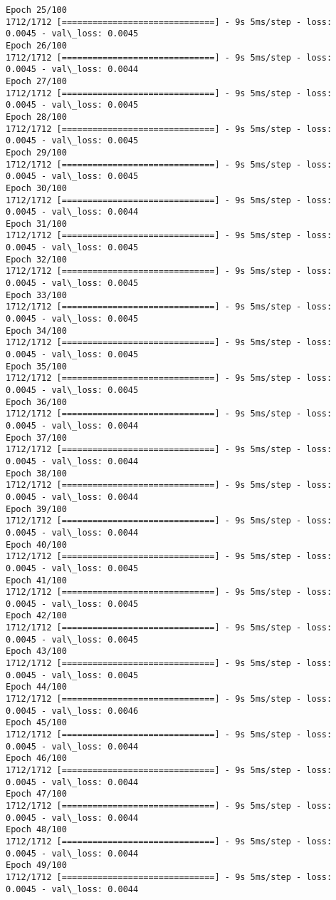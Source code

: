\documentclass[11pt]{article}
\begin{document}
\begin{Verbatim}[commandchars=\\\{\}]
Epoch 25/100
1712/1712 [==============================] - 9s 5ms/step - loss: 0.0045 - val\_loss: 0.0045
Epoch 26/100
1712/1712 [==============================] - 9s 5ms/step - loss: 0.0045 - val\_loss: 0.0044
Epoch 27/100
1712/1712 [==============================] - 9s 5ms/step - loss: 0.0045 - val\_loss: 0.0045
Epoch 28/100
1712/1712 [==============================] - 9s 5ms/step - loss: 0.0045 - val\_loss: 0.0045
Epoch 29/100
1712/1712 [==============================] - 9s 5ms/step - loss: 0.0045 - val\_loss: 0.0045
Epoch 30/100
1712/1712 [==============================] - 9s 5ms/step - loss: 0.0045 - val\_loss: 0.0044
Epoch 31/100
1712/1712 [==============================] - 9s 5ms/step - loss: 0.0045 - val\_loss: 0.0045
Epoch 32/100
1712/1712 [==============================] - 9s 5ms/step - loss: 0.0045 - val\_loss: 0.0045
Epoch 33/100
1712/1712 [==============================] - 9s 5ms/step - loss: 0.0045 - val\_loss: 0.0045
Epoch 34/100
1712/1712 [==============================] - 9s 5ms/step - loss: 0.0045 - val\_loss: 0.0045
Epoch 35/100
1712/1712 [==============================] - 9s 5ms/step - loss: 0.0045 - val\_loss: 0.0045
Epoch 36/100
1712/1712 [==============================] - 9s 5ms/step - loss: 0.0045 - val\_loss: 0.0044
Epoch 37/100
1712/1712 [==============================] - 9s 5ms/step - loss: 0.0045 - val\_loss: 0.0044
Epoch 38/100
1712/1712 [==============================] - 9s 5ms/step - loss: 0.0045 - val\_loss: 0.0044
Epoch 39/100
1712/1712 [==============================] - 9s 5ms/step - loss: 0.0045 - val\_loss: 0.0044
Epoch 40/100
1712/1712 [==============================] - 9s 5ms/step - loss: 0.0045 - val\_loss: 0.0045
Epoch 41/100
1712/1712 [==============================] - 9s 5ms/step - loss: 0.0045 - val\_loss: 0.0045
Epoch 42/100
1712/1712 [==============================] - 9s 5ms/step - loss: 0.0045 - val\_loss: 0.0045
Epoch 43/100
1712/1712 [==============================] - 9s 5ms/step - loss: 0.0045 - val\_loss: 0.0045
Epoch 44/100
1712/1712 [==============================] - 9s 5ms/step - loss: 0.0045 - val\_loss: 0.0046
Epoch 45/100
1712/1712 [==============================] - 9s 5ms/step - loss: 0.0045 - val\_loss: 0.0044
Epoch 46/100
1712/1712 [==============================] - 9s 5ms/step - loss: 0.0045 - val\_loss: 0.0044
Epoch 47/100
1712/1712 [==============================] - 9s 5ms/step - loss: 0.0045 - val\_loss: 0.0044
Epoch 48/100
1712/1712 [==============================] - 9s 5ms/step - loss: 0.0045 - val\_loss: 0.0044
Epoch 49/100
1712/1712 [==============================] - 9s 5ms/step - loss: 0.0045 - val\_loss: 0.0044

\end{Verbatim}
\end{document}
